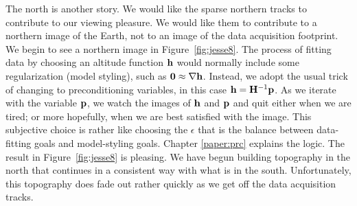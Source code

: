 \par
The north is another story.
We would like the sparse northern tracks
to contribute to our viewing pleasure.
We would like them to contribute to a northern image of the Earth,
not to an image of the data acquisition footprint.
We begin to see a northern image in Figure~\ref{fig:jesse8}.
The process of fitting data by choosing an altitude function $\bold h$
would normally include some regularization (model styling),
such as
$\bold 0\approx \nabla \bold h$.
Instead,
we adopt the usual trick
of changing to preconditioning variables,
in this case $\bold h = \bold H^{-1}\bold p$.
As we iterate with the variable $\bold p$,
we watch the images
of $\bold h$ and $\bold p$ and quit either when we are tired;
or more hopefully, when we are best satisfied with the image.
This subjective choice is rather like choosing the $\epsilon$
that is the balance between data-fitting goals and model-styling goals.
Chapter \ref{paper:prc} explains the logic.
The result
in Figure~\ref{fig:jesse8}
is pleasing.
We have begun building topography in the north that continues
in a consistent way with what is in the south.
Unfortunately, this topography does fade out rather quickly
as we get off the data acquisition tracks.


